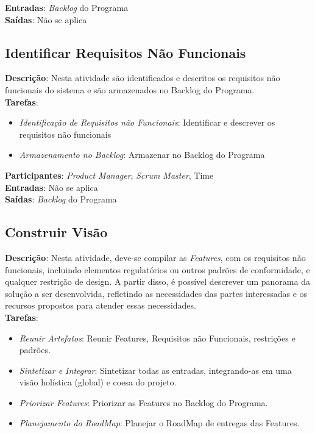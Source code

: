   \textbf{Entradas}: \textit{Backlog} do Programa \\

  \textbf{Saídas}:  Não se aplica\\

\subsection{Identificar Requisitos Não Funcionais}
  \textbf{Descrição}: Nesta atividade são identificados e descritos os requisitos não funcionais do sistema e são armazenados no Backlog do Programa.  \\

  \textbf{Tarefas}:
  \begin{itemize}
   \item \indent \textit{Identificação de Requisitos não Funcionais}: Identificar e descrever os requisitos não funcionais

   \item \indent \textit{Armazenamento no Backlog}: Armazenar no Backlog do Programa
  \end{itemize}

  \textbf{Participantes}: \textit{Product Manager}, \textit{Scrum Master}, Time \\

  \textbf{Entradas}:  Não se aplica\\

  \textbf{Saídas}:  \textit{Backlog} do Programa\\

\subsection{Construir Visão}
  \textbf{Descrição}: Nesta atividade, deve-se compilar as \textit{Features}, com os requisitos não funcionais, incluindo elementos
  regulatórios ou outros padrões de conformidade, e qualquer restrição de design. A partir disso, é possível descrever um panorama da solução a
  ser desenvolvida, refletindo as necessidades das partes interessadas e os recursos propostos para atender essas necessidades. \\

  \textbf{Tarefas}:
  \begin{itemize}
   \item \indent \textit{Reunir Artefatos}: Reunir Features, Requisitos não Funcionais, restrições e padrões.

   \item \indent \textit{Sintetizar e Integrar}: Sintetizar todas as entradas, integrando-as em uma visão holística (global) e coesa do projeto.

   \item \indent \textit{Priorizar Features}: Priorizar as Features no Backlog do Programa.

   \item \indent \textit{Planejamento do RoadMap}: Planejar o RoadMap de entregas das Features.
  \end{itemize}

